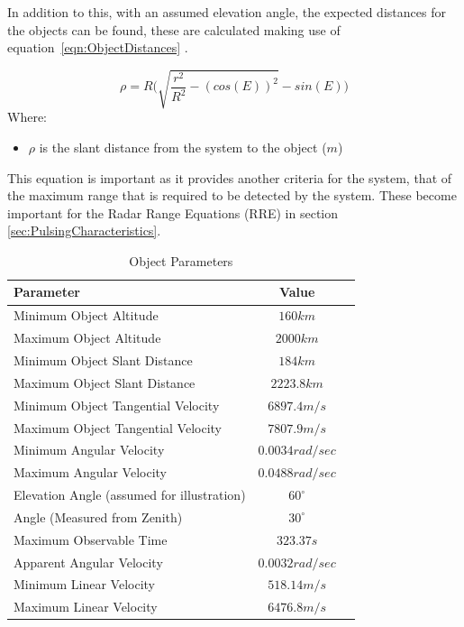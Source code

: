 \documentclass[11pt]{witseiepaper}
\begin{document}
\begin{bibunit}[witseie]
In addition to this, with an assumed elevation angle, the expected distances for the objects can be found, these are calculated making use of equation~\ref{eqn:ObjectDistances} \cite{ObservableTime}.


\begin{equation} \label{eqn:ObjectDistances}
    \rho = R \Bigg(\sqrt{\frac{r^2}{R^2} - (cos(E))^2} - sin(E) \Bigg)
    \end{equation}
Where:
\begin{itemize}
    \item $\rho$ is the slant distance from the system to the object ($m$)
\end{itemize}
This equation is important as it provides another criteria for the system, that of the maximum range that is required to be detected by the system. These become important for the Radar Range Equations (RRE) in section \ref{sec:PulsingCharacteristics}.

\begin{table}
    \caption{Object Parameters}
    \label{tab:ObjectParameters}
    \begin{center}
        \begin{tabular}{p{70mm}cp{70mm}}
            \hline 
            Parameter & Value \\
            \hline
            Minimum Object Altitude & $160 km$ \\
            Maximum Object Altitude & $2000 km$ \\
            Minimum Object Slant Distance & $184 km$ \\
            Maximum Object Slant Distance & $2223.8 km$ \\            
            Minimum Object Tangential Velocity & $6897.4 m/s$ \\
            Maximum Object Tangential Velocity & $7807.9 m/s$ \\
            Minimum Angular Velocity & $0.0034 rad/sec$ \\
            Maximum Angular Velocity & $0.0488 rad/sec$ \\
            Elevation Angle (assumed for illustration) & $60^{\circ}$ \\
            Angle (Measured from Zenith) & $30^{\circ}$ \\
            Maximum Observable Time & $323.37 s$ \\
            Apparent Angular Velocity & $0.0032 rad/sec$ \\
            Minimum Linear Velocity & $518.14 m/s$ \\
            Maximum Linear Velocity & $6476.8 m/s$ \\
        \end{tabular}
    \end{center}
\end{table}


\end{bibunit}
\end{document}
